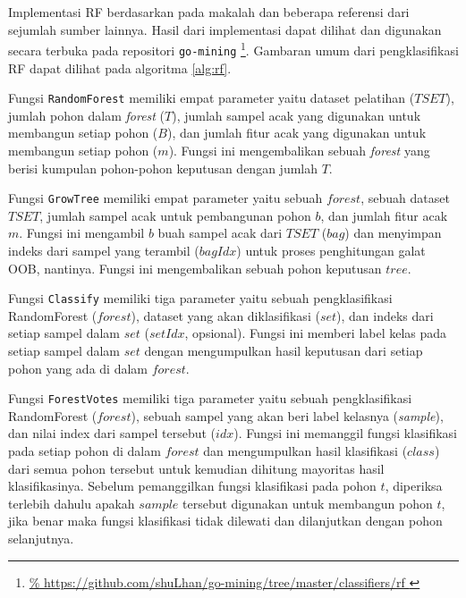 Implementasi RF berdasarkan pada makalah \textcite{breiman2001random}
dan beberapa referensi dari sejumlah sumber lainnya.
Hasil dari implementasi dapat dilihat dan digunakan secara terbuka pada
repositori \texttt{go-mining}
\footnote{
\url{%
https://github.com/shuLhan/go-mining/tree/master/classifiers/rf
}}.
Gambaran umum dari pengklasifikasi RF dapat dilihat pada algoritma
\ref{alg:rf}.

	

Fungsi \texttt{RandomForest} memiliki empat parameter yaitu dataset pelatihan
($TSET$),
jumlah pohon dalam \textit{forest} ($T$), jumlah sampel acak yang digunakan untuk
membangun setiap pohon ($B$), dan jumlah fitur acak yang digunakan untuk membangun
setiap pohon ($m$).
Fungsi ini mengembalikan sebuah \textit{forest} yang berisi kumpulan
pohon-pohon keputusan dengan jumlah $T$.

Fungsi \texttt{GrowTree} memiliki empat parameter yaitu sebuah $forest$, sebuah
dataset $TSET$, jumlah sampel acak untuk pembangunan pohon $b$, dan jumlah
fitur acak $m$.
Fungsi ini mengambil $b$ buah sampel acak dari $TSET$ ($bag$) dan menyimpan
indeks dari sampel yang terambil ($bagIdx$) untuk proses penghitungan galat
OOB, nantinya.
Fungsi ini mengembalikan sebuah pohon keputusan $tree$.

Fungsi \texttt{Classify} memiliki tiga parameter yaitu sebuah pengklasifikasi
RandomForest ($forest$), dataset yang akan diklasifikasi ($set$), dan indeks
dari setiap sampel dalam $set$ ($setIdx$, opsional).
Fungsi ini memberi label kelas pada setiap sampel dalam $set$ dengan
mengumpulkan hasil keputusan dari setiap pohon yang ada di dalam $forest$.

Fungsi \texttt{ForestVotes} memiliki tiga parameter yaitu sebuah
pengklasifikasi RandomForest ($forest$), sebuah sampel yang akan beri label
kelasnya (\textit{sample}), dan nilai index dari sampel tersebut ($idx$).
Fungsi ini memanggil fungsi klasifikasi pada setiap pohon di dalam $forest$ dan
mengumpulkan hasil klasifikasi ($class$) dari semua pohon tersebut untuk
kemudian dihitung mayoritas hasil klasifikasinya.
Sebelum pemanggilkan fungsi klasifikasi pada pohon $t$, diperiksa terlebih
dahulu apakah $sample$ tersebut digunakan untuk membangun pohon $t$, jika benar
maka fungsi klasifikasi tidak dilewati dan dilanjutkan dengan pohon
selanjutnya.
